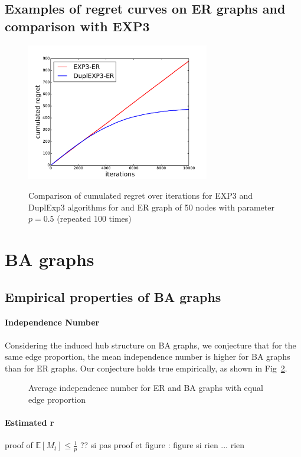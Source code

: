 \documentclass[10pt,a4paper]{scrartcl}
\providecommand{\E}{\mathbb{E}}
\begin{document}
\subsection{Examples of regret curves on ER graphs and comparison with EXP3}

\begin{figure}[h]
\centering
\includegraphics[height=6cm]{figures/50new_dupl_big_r05.pdf}
\label{duplexp3vsexp3ER}
\caption{Comparison of cumulated regret over iterations for EXP3 and DuplExp3 algorithms for and ER graph of 50 nodes with parameter $p=0.5$ (repeated 100 times)}
\end{figure}

\section{BA graphs}
\subsection{Empirical properties of BA graphs}
\paragraph{Independence Number}
Considering the induced hub structure on BA graphs, we conjecture that for the same edge proportion, the mean independence number is higher for BA graphs than for ER graphs. Our conjecture holds true empirically, as shown in Fig~\ref{mean_alpha_ba_er}.

\begin{figure}
 \label{mean_alpha_ba_er}
 \caption{Average independence number for ER and BA graphs with equal edge proportion}
\end{figure}

\paragraph{Estimated r}
proof of $\E[M_t] \leq \frac{1}{p}$ ??
si pas proof et figure : figure
si rien ... rien
\end{document}
